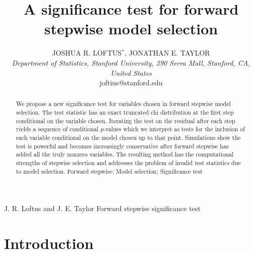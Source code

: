 \documentclass[oupdraft]{bio}
\begin{document}
\title{A significance test for forward stepwise model selection}

\author{JOSHUA R. LOFTUS$^\ast$, JONATHAN E. TAYLOR\\[4pt]
\textit{Department of Statistics,
Stanford University,
290 Serra Mall, Stanford, CA,
United States}
\\[2pt]
{joftius@stanford.edu}}

\markboth%
{J. R. Loftus and J. E. Taylor}
{Forward stepwise significance test}

\maketitle


\begin{abstract}
{We propose a new significance test for variables
chosen in forward stepwise model selection.
The test statistic has an
exact truncated chi distribution at the first step conditional on the
variable chosen. Iterating the test on the residual after each step
yields a sequence of conditional $p$-values which we interpret as
tests for the inclusion of each variable conditional on the model
chosen up to that point. Simulations show the test is powerful and
becomes increasingly conservative after forward stepwise has added all
the truly nonzero variables. The resulting method has the
computational strengths of stepwise selection and addresses the
problem of invalid test statistics due to model selection.}
{Forward stepwise; Model selection; Significance test}
\end{abstract}


\section{Introduction}
\end{document}
